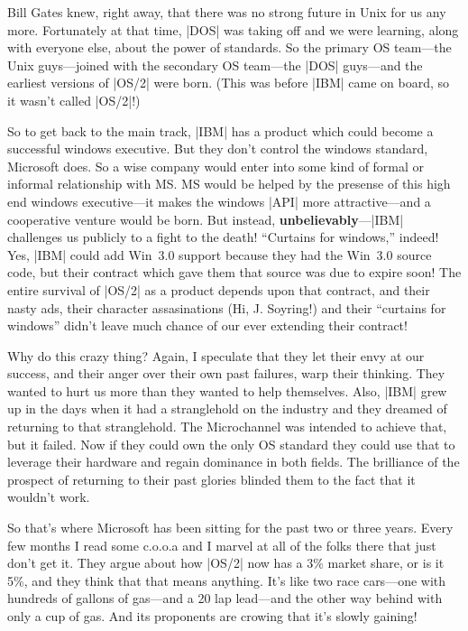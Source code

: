 Bill Gates knew, right away, that there was no
strong future in Unix for us any more.  Fortunately at that time, |DOS|
was taking off and we were learning, along with everyone else, about
the power of standards.  So the primary OS team---the Unix guys---joined
with the secondary OS team---the |DOS| guys---and the earliest versions
of |OS/2| were born.  (This was before |IBM| came on board, so it wasn't called 
|OS/2|!)

So to get back to the main track, |IBM| has a product which could
become a successful windows executive.  But they don't control the
windows standard, Microsoft does.  So a wise company would enter into
some kind of formal or informal relationship with MS.  MS would be
helped by the presense of this high end windows executive---it makes
the windows |API| more attractive---and a cooperative venture would be
born.  But instead, {\bf unbelievably}---|IBM| challenges us publicly
to a fight to the death!  ``Curtains for windows,'' indeed!  Yes,
|IBM| could add Win~3.0 support because they had the Win~3.0 source
code, but their contract which gave them that source was due to expire
soon!  The entire survival of |OS/2| as a product depends upon that
contract, and their nasty ads, their character assasinations (Hi,
J. Soyring!)  and their ``curtains for windows'' didn't leave much
chance of our ever extending their contract!

Why do this crazy thing?  Again, I speculate that they let their envy
at our success, and their anger over their own past failures, warp their
thinking.  They wanted to hurt us more than they wanted to help themselves.
Also, |IBM| grew up in the days when it had a stranglehold on the industry
and they dreamed of returning to that stranglehold.  The Microchannel
was intended to achieve that, but it failed.  Now if they could own the
only OS standard they could use that to leverage their hardware and
regain dominance in both fields.  The brilliance of the prospect of
returning to their past glories blinded them to the fact that it wouldn't
work.

So that's where Microsoft has been sitting for the past two or three
years.  Every few months I read some c.o.o.a and I marvel at all of
the folks there that just don't get it.  They argue about how |OS/2| now has
a 3\% market share, or is it 5\%, and they think that that means anything.
It's like two race cars---one with hundreds of gallons of gas---and
a 20 lap lead---and the other way behind with only a cup of gas.  And
its proponents are crowing that it's slowly gaining!

